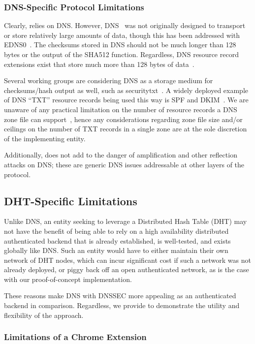 \subsubsection{DNS-Specific Protocol Limitations}

Clearly, \DNSSYS{} relies on DNS. However, DNS~\cite{DNS1} was not originally
designed to transport or store relatively large amounts of data, though this has
been addressed with EDNS0~\cite{EDNS}. The checksums stored in DNS should not be
much longer than 128 bytes or the output of the SHA512 function. Regardless, DNS
resource record extensions exist that store much more than 128 bytes of
data~\cite{CERT, IPSECKEY, DANE3, DANE1}.

Several working groups are considering DNS as a storage medium for
checksums/hash output as well, such as securitytxt~\cite{draft-sectxt}. A widely
deployed example of DNS ``TXT'' resource records being used this way is SPF and
DKIM~\cite{DKIM}. We are unaware of any practical limitation on the number of
resource records a DNS zone file can support~\cite{DNS1}, hence any
considerations regarding zone file size and/or ceilings on the number of TXT
records in a single zone are at the sole discretion of the implementing entity.

Additionally, \DNSSYS{} does not add to the danger of amplification and other
reflection attacks on DNS; these are generic DNS issues addressable at other
layers of the protocol.

\subsection{DHT-Specific Limitations}

Unlike DNS, an entity seeking to leverage a Distributed Hash Table (DHT) may not
have the benefit of being able to rely on a high availability distributed
authenticated backend that is already established, is well-tested, and exists
globally like DNS. Such an entity would have to either maintain their own
network of DHT nodes, which can incur significant cost if such a network was not
already deployed, or piggy back off an open authenticated network, as is the
case with our proof-of-concept \DHTSYS{} implementation.

These reasons make DNS with DNSSEC more appealing as an authenticated backend in
comparison. Regardless, we provide \DHTSYS{} to demonstrate the utility and
flexibility of the \SYSTEM{} approach.

\subsubsection{Limitations of a Chrome Extension}

